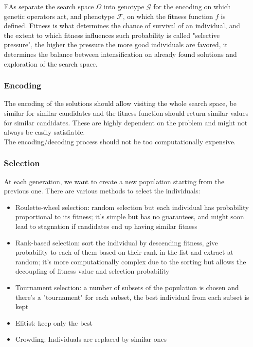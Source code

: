 EAs separate the search space $\Omega$ into genotype $\mathcal{G}$ for the encoding on which genetic operators act, and phenotype $\mathcal{F}$, on which the fitness function $f$ is defined. Fitness is what determines the chance of survival of an individual, and the extent to which fitness influences such probability is called "selective pressure", the higher the pressure the more good individuals are favored, it determines the balance between intensification on already found solutions and exploration of the search space.\\

\subsubsection{Encoding}
The encoding of the solutions should allow visiting the whole search space, be similar for similar candidates and the fitness function should return similar values for similar candidates. These are highly dependent on the problem and might not always be easily satisfiable.\\
The encoding/decoding process should not be too computationally expensive.\\

\subsubsection{Selection}
At each generation, we want to create a new population starting from the previous one. There are various methods to select the individuals:
\begin{itemize}
	\item Roulette-wheel selection: random selection but each individual has probability proportional to its fitness; it's simple but has no guarantees, and might soon lead to stagnation if candidates end up having similar fitness
	\item Rank-based selection: sort the individual by descending fitness, give probability to each of them based on their rank in the list and extract at random; it's more computationally complex due to the sorting but allows the decoupling of fitness value and selection probability
	\item Tournament selection: a number of subsets of the population is chosen and there's a "tournament" for each subset, the best individual from each subset is kept
	\item Elitist: keep only the best
	\item Crowding: Individuals are replaced by similar ones
\end{itemize}

